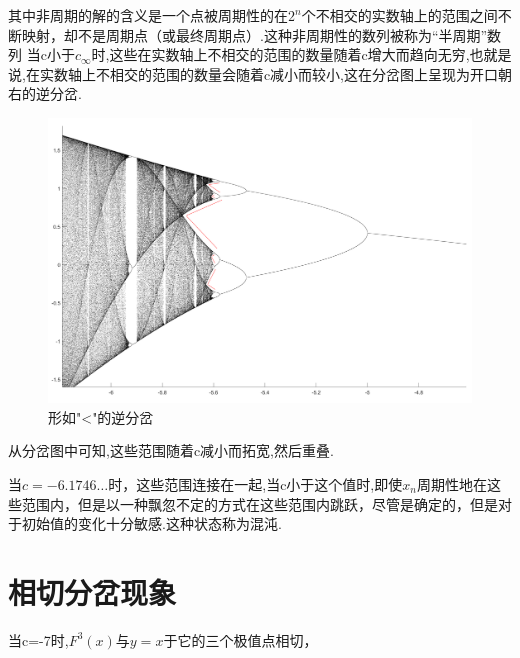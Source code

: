 \documentclass[a4paper]{article}%
\begin{document}
其中非周期的解的含义是一个点被周期性的在$2^n$个不相交的实数轴上的范围之间不断映射，却不是周期点（或最终周期点）.这种非周期性的数列被称为“半周期”数列\cite{c}
当c小于$c_{\infty}$时,这些在实数轴上不相交的范围的数量随着c增大而趋向无穷,也就是说,在实数轴上不相交的范围的数量会随着c减小而较小,这在分岔图上呈现为开口朝右的逆分岔.
\begin{figure}[ht]
    \centering
    \includegraphics[scale=0.27]{图四}
    \caption[图四]{形如"<"的逆分岔}\label{fig-图四}
    \end{figure}


从分岔图中可知,这些范围随着c减小而拓宽,然后重叠.


当$c=-6.1746\ldots $时，这些范围连接在一起,当c小于这个值时,即使$x_n$周期性地在这些范围内，但是以一种飘忽不定的方式在这些范围内跳跃，尽管是确定的，但是对于初始值的变化十分敏感.这种状态称为混沌.\cite{c}

\section{相切分岔现象}

当c=-7时,$F^{3}(x)$与$y=x$于它的三个极值点相切，
\end{document}
